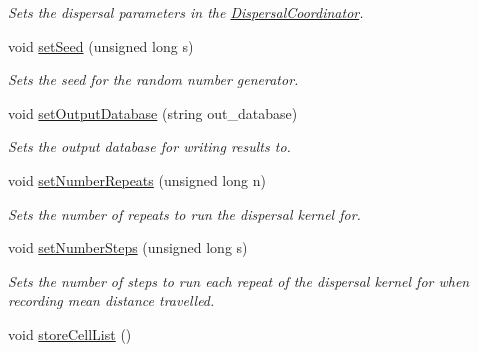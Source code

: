 \begin{DoxyCompactItemize}
\begin{DoxyCompactList}\small\item\em Sets the dispersal parameters in the \hyperlink{class_dispersal_coordinator}{Dispersal\+Coordinator}. \end{DoxyCompactList}\item 
void \hyperlink{class_simulate_dispersal_a46f2cd557ac9b21c107eac75e7c916af}{set\+Seed} (unsigned long s)
\begin{DoxyCompactList}\small\item\em Sets the seed for the random number generator. \end{DoxyCompactList}\item 
void \hyperlink{class_simulate_dispersal_acae5067045d5989df6d7dce80bcfe276}{set\+Output\+Database} (string out\+\_\+database)
\begin{DoxyCompactList}\small\item\em Sets the output database for writing results to. \end{DoxyCompactList}\item 
void \hyperlink{class_simulate_dispersal_a29c7cf41d8b5610109d61f302fb32e73}{set\+Number\+Repeats} (unsigned long n)
\begin{DoxyCompactList}\small\item\em Sets the number of repeats to run the dispersal kernel for. \end{DoxyCompactList}\item 
void \hyperlink{class_simulate_dispersal_a4a38f61284426daa4d968bbab91d3608}{set\+Number\+Steps} (unsigned long s)
\begin{DoxyCompactList}\small\item\em Sets the number of steps to run each repeat of the dispersal kernel for when recording mean distance travelled. \end{DoxyCompactList}\item 
void \hyperlink{class_simulate_dispersal_a85d8ee68e5f4962429571c835aa028b4}{store\+Cell\+List} ()\hypertarget{class_simulate_dispersal_a85d8ee68e5f4962429571c835aa028b4}{}\label{class_simulate_dispersal_a85d8ee68e5f4962429571c835aa028b4}


\end{DoxyCompactItemize}
